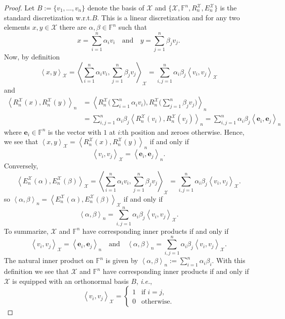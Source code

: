 \documentclass[a4paper]{paper}
\makeatletter
\newcommand{\VecSpace}[1]{\mathscr{#1}}
\newcommand{\Field}{\mathbb{F}}
\newcommand*{\EXT}[2]{\ensuremath{E_{#1}^{#2}}}
\newcommand*{\REST}[2]{\ensuremath{R_{#1}^{#2}}}
\newcommand*{\RnX}{\ensuremath{\REST{n}{\VecSpace{X}}}}
\newcommand*{\EnX}{\ensuremath{\EXT{n}{\VecSpace{X}}}}
\newcommand{\ip}[2]{\left \langle #1,#2 \right\rangle}
\newcommand{\ie}{\textsl{i.e.}\xspace}
\newcommand{\wrt}{{w.r.t.}\@\xspace}
\newcommand{\ve}{\boldsymbol{e}}
\makeatother
\begin{document}
\begin{proof}
Let $B := \{ v_1, \ldots, v_n \}$ denote the basis of $\VecSpace{X}$ and $\{ \VecSpace{X},\Field^{n},\RnX,\EnX\}$ 
is the standard discretization \wrt $B$. This is a linear discretization and for any two elements 
$x,y \in \VecSpace{X}$ there are $\alpha,\beta\in\Field^{n}$ such that 
\[  x = \sum_{i=1}^n \alpha_i v_i \quad\text{and}\quad y = \sum_{j=1}^n \beta_j v_j. \]
Now, by definition
\[ 
   \ip{x}{y}_{\VecSpace{X}} = \ip{\sum_{i=1}^n \alpha_i v_i }{\sum_{j=1}^n \beta_j v_j}_{\VecSpace{X}} 
    =    \sum_{i,j=1}^n \alpha_i\beta_j \ip{v_i}{v_j}_{\VecSpace{X}}
\]
and
\begin{align*}
   \ip{\RnX(x)}{\RnX(y)}_{n} &=
       \ip{\RnX\biggl( \sum_{i=1}^n \alpha_i v_i  \biggr) }
           {\RnX \biggl( \sum_{j=1}^n \beta_j v_j  \biggr)}_{n} \\
  &= \sum_{i,j=1}^n \alpha_i \beta_j \ip{\RnX(v_i)}{\RnX(v_j)}_{n} =
        \sum_{i,j=1}^n \alpha_i \beta_j \ip{\ve_i}{\ve_j}_{n}
\end{align*}
where $\ve_i\in\Field^{n}$ is the vector with $1$ at $i$:th position and zeroes otherwise. 
Hence, we see that $\ip{x}{y}_{\VecSpace{X}} =  \ip{\RnX(x)}{\RnX(y)}_{n}$ if and only if 
\[ \ip{v_i}{v_j}_{\VecSpace{X}}=\ip{\ve_i}{\ve_j}_{n}. \]
Conversely,
\[ \ip{\EnX(\alpha)}{\EnX(\beta)}_{\VecSpace{X}} =
       \ip{  \sum_{i=1}^n \alpha_i v_i }{ \sum_{j=1}^n \beta_j v_j }_{\VecSpace{X}} 
   = \sum_{i,j=1}^n \alpha_i \beta_j \ip{v_i}{v_j}_{\VecSpace{X}}.
\]
so $ \ip{\alpha}{\beta}_{n} = \ip{\EnX(\alpha)}{\EnX(\beta)}_{\VecSpace{X}}$ if and only if 
\[  \ip{\alpha}{\beta}_{n} =  \sum_{i,j=1}^n \alpha_i \beta_j \ip{v_i}{v_j}_{\VecSpace{X}}. \]
To summarize, $\VecSpace{X}$ and $\Field^{n}$ have corresponding inner products if and only if 
\[  \ip{v_i}{v_j}_{\VecSpace{X}}= \ip{\ve_i}{\ve_j}_{n}
    \quad\text{and}\quad
    \ip{\alpha}{\beta}_{n} = \sum_{i,j=1}^n \alpha_i \beta_j \ip{v_i}{v_j}_{\VecSpace{X}}. \]
The natural inner product on $\Field^{n}$ is given by 
$\ip{\alpha}{\beta}_{n} :=\sum_{i=1}^n\alpha_i \beta_i$. With this definition we see that 
$\VecSpace{X}$ and $\Field^{n}$ have corresponding inner products if and only if $\VecSpace{X}$ is equipped with an 
orthonormal basis $B$, \ie, 
\[ \ip{v_i}{v_j}_{\VecSpace{X}} = \begin{cases} 1 & \text{if $i=j$,} \\ 0 & \text{otherwise.} \end{cases} \]
\end{proof}
\end{document}
